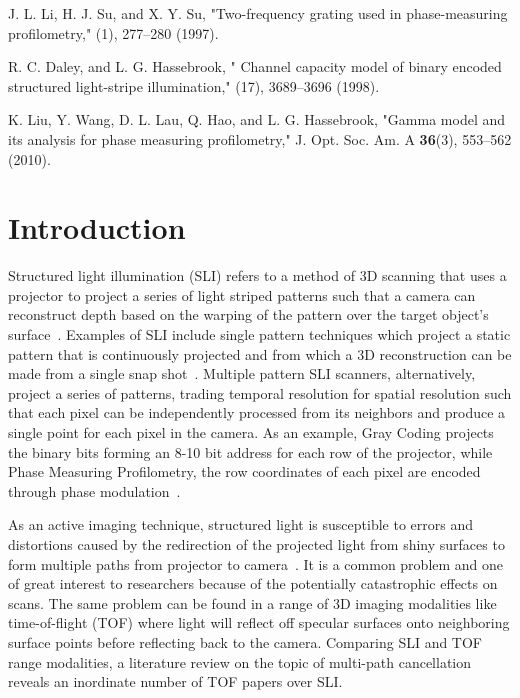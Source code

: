 \documentclass[10pt]{article}
\begin{document}
\begin{thebibliography}{99}
  J. L. Li, H. J. Su,  and  X. Y. Su,  "Two-frequency grating used in phase-measuring profilometry," (1), 277--280 (1997).

  R. C. Daley, and L. G. Hassebrook,  " Channel capacity model of binary encoded structured light-stripe illumination," (17), 3689--3696 (1998).

  K. Liu, Y. Wang, D. L. Lau, Q. Hao, and L. G. Hassebrook,  "Gamma model and its analysis for phase measuring profilometry," J. Opt. Soc. Am. A {\bfseries 36}(3), 553--562 (2010).



% 
% 

\end{thebibliography}

% 
% 

\section{Introduction}
Structured light illumination (SLI) refers to a method of 3D scanning that uses a projector to project a series of light striped patterns such that a camera can reconstruct depth based on the warping of the pattern over the target object's surface~\cite{morano1998structured,geng2011structured,gupta2013structured,gupta2012micro,liu2010dual,gupta2011structured,rosman2016information,o20143d}.  Examples of SLI include single pattern techniques which project a static pattern that is continuously projected and from which a 3D reconstruction can be made from a single snap shot~\cite{geng2011structured,boyer1987color,geng1996rainbow, freedman2012depth}.  Multiple pattern SLI scanners, alternatively, project a series of patterns, trading temporal resolution for spatial resolution such that each pixel can be independently processed from its neighbors and produce a single point for each pixel in the camera. As an example, Gray Coding projects the binary bits forming an 8-10 bit address for each row of the projector, while Phase Measuring Profilometry, the row coordinates of each pixel are encoded through phase modulation~\cite{srinivasan1984automated,liu2010dual,geng2011structured,chen2008modulated}. 

As an active imaging technique, structured light is susceptible to errors and distortions caused by the redirection of the projected light from shiny surfaces to form multiple paths from projector to camera~\cite{6136522}.  It is a common problem and one of great interest to researchers because of the potentially catastrophic effects on scans. The same problem can be found in a range of 3D imaging modalities like time-of-flight (TOF) where light will reflect off specular surfaces onto neighboring surface points before reflecting back to the camera. Comparing SLI and TOF range modalities, a literature review on the topic of multi-path cancellation reveals an inordinate number of TOF papers over SLI.
\end{document}
